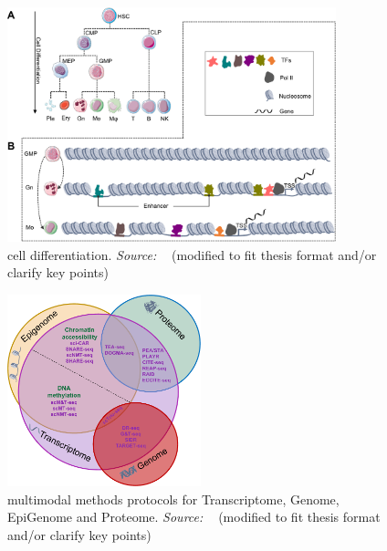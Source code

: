 \begin{figure}[!ht]
	\centering
	\includegraphics[width=0.85\textwidth]{cell_differentiation/fig}
	\vspace{0.1cm}
	\caption[cell differentiation]{cell differentiation. \emph{Source: ~\cite{lee2020single}} (modified to fit thesis format and/or clarify key points)}
	\label{fig:piechart-mulitmodal-methods}
\end{figure}



\begin{figure}[!ht]
	\centering
	\includegraphics[width=0.50\textwidth]{multi-model-methods/fig}
	\vspace{0.1cm}
	\caption[multimodal methods protocols for Transcriptome, Genome, EpiGenome and Proteome]{multimodal methods protocols for Transcriptome, Genome, EpiGenome and Proteome. \emph{Source: ~\cite{lee2020single}} (modified to fit thesis format and/or clarify key points)}
	\label{fig:piechart-mulitmodal-methods}
\end{figure}



